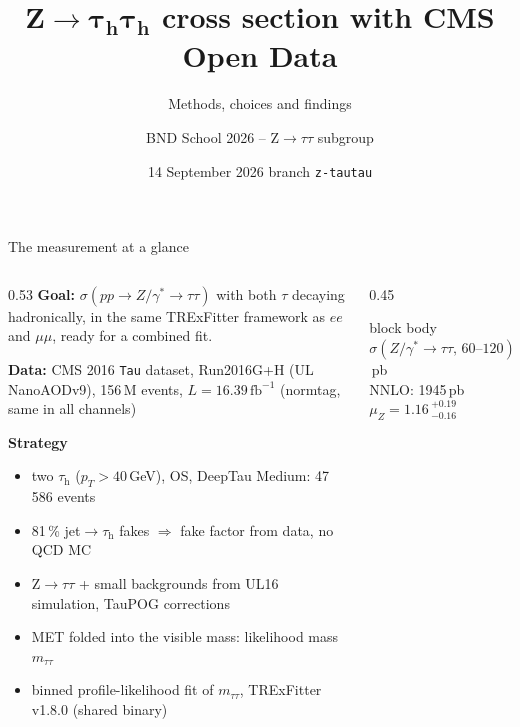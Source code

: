\documentclass[aspectratio=169,9pt]{beamer}
\title{$\mathbf{Z\rightarrow\tau_h\tau_h}$ cross section with CMS Open Data}
\subtitle{Methods, choices and findings}
\author{BND School 2026 -- Z$\rightarrow\tau\tau$ subgroup}
\date{14 September 2026 \quad\textbullet\quad branch \texttt{z-tautau}}
\newcommand{\tauh}{\ensuremath{\tau_\mathrm{h}}}
\newcommand{\mtt}{\ensuremath{m_{\tau\tau}}}
\begin{document}
\maketitle

\begin{frame}{The measurement at a glance}
\begin{columns}[T]
\begin{column}{0.53\textwidth}
\small
\textbf{Goal:} $\sigma(pp\rightarrow Z/\gamma^*\rightarrow\tau\tau)$ with both $\tau$ decaying hadronically, in the same
TRExFitter framework as $ee$ and $\mu\mu$, ready for a combined fit.

\medskip
\textbf{Data:} CMS 2016 \texttt{Tau} dataset, Run2016G+H (UL NanoAODv9), 156\,M events,
$L = 16.39\,\mathrm{fb}^{-1}$ (normtag, same in all channels)

\medskip
\textbf{Strategy}
\begin{itemize}\setlength\itemsep{1pt}
\item two \tauh{} ($p_T>40$\,GeV), OS, DeepTau Medium: 47\,586 events
\item \alert{81\,\% jet$\rightarrow$\tauh{} fakes} $\Rightarrow$ fake factor from data, no QCD MC
\item Z$\rightarrow\tau\tau$ + small backgrounds from UL16 simulation, TauPOG corrections
\item MET folded into the visible mass: likelihood mass \mtt
\item binned profile-likelihood fit of \mtt, TRExFitter v1.8.0 (shared binary)
\end{itemize}
\end{column}
\begin{column}{0.45\textwidth}
\centering
{}

\vspace{2mm}
\begin{beamercolorbox}[rounded=true, shadow=false, sep=4pt]{block body}
\small
$\sigma(Z/\gamma^*\!\rightarrow\!\tau\tau,\,60\text{--}120) = 2255\pm36\,^{+371}_{-315}\pm83$\,pb\\
NNLO: 1945\,pb \qquad $\mu_Z = 1.16\,^{+0.19}_{-0.16}$
\end{beamercolorbox}
\end{column}
\end{columns}
\end{frame}
\end{document}
